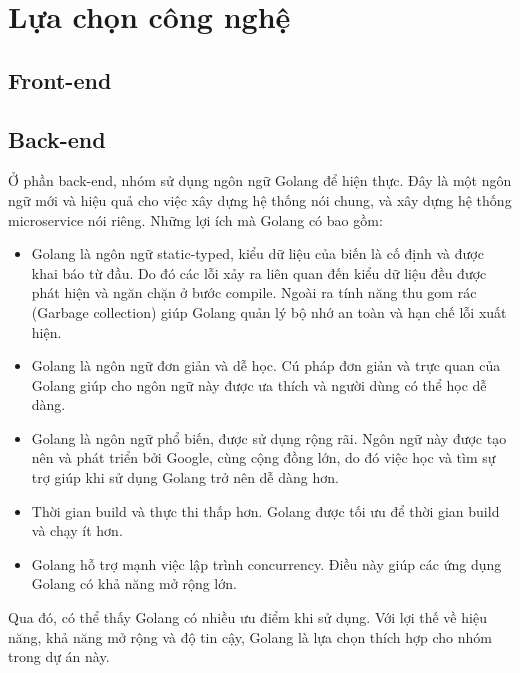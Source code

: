 \section{Lựa chọn công nghệ}

    \subsection{Front-end}
    
    \subsection{Back-end}
\par Ở phần back-end, nhóm sử dụng ngôn ngữ Golang để hiện thực. Đây là một ngôn ngữ mới và hiệu quả cho việc xây dựng hệ thống nói chung, và xây dựng hệ thống microservice nói riêng.
Những lợi ích mà Golang có bao gồm:
\begin{itemize}
    \item Golang là ngôn ngữ static-typed, kiểu dữ liệu của biến là cố định và được khai báo từ đầu. Do đó các lỗi xảy ra liên quan đến kiểu dữ liệu đều được phát hiện và ngăn chặn ở bước compile. Ngoài ra tính năng thu gom rác (Garbage collection) giúp Golang quản lý bộ nhớ an toàn và hạn chế lỗi xuất hiện.
    \item Golang là ngôn ngữ đơn giản và dễ học. Cú pháp đơn giản và trực quan của Golang giúp cho ngôn ngữ này được ưa thích và người dùng có thể học dễ dàng.
    \item Golang là ngôn ngữ phổ biến, được sử dụng rộng rãi. Ngôn ngữ này được tạo nên và phát triển bởi Google, cùng cộng đồng lớn, do đó việc học và tìm sự trợ giúp khi sử dụng Golang trở nên dễ dàng hơn.
    \item Thời gian build và thực thi thấp hơn. Golang được tối ưu để thời gian build và chạy ít hơn.
    \item Golang hỗ trợ mạnh việc lập trình concurrency. Điều này giúp các ứng dụng Golang có khả năng mở rộng lớn.
\end{itemize}
\par Qua đó, có thể thấy Golang có nhiều ưu điểm khi sử dụng. Với lợi thế về hiệu năng, khả năng mở rộng và độ tin cậy, Golang là lựa chọn thích hợp cho nhóm trong dự án này.